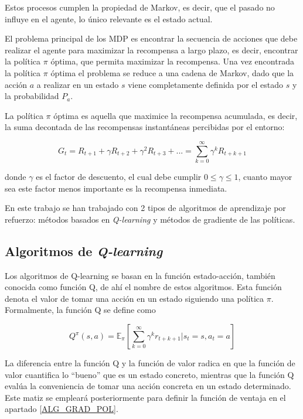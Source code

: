 Estos procesos cumplen la propiedad de Markov, es decir, que el pasado no influye en el agente, lo único relevante es el estado actual.

El problema principal de los MDP es encontrar la secuencia de acciones que debe realizar el agente para maximizar la recompensa a largo plazo, es decir, encontrar la política $\pi$ 
óptima, que permita maximizar la recompensa. Una vez encontrada la política $\pi$ óptima el problema se reduce a una cadena de Markov, dado que la acción $a$ a realizar en un estado $s$ viene completamente definida por el estado $s$ y la probabilidad $P_a$. 

La política $\pi$ óptima es aquella que maximice la recompensa acumulada, es decir, la suma decontada de las recompensas instantáneas percibidas por el entorno:

\begin{equation}
	G_t = R_{t+1} + \gamma R_{t+2} + \gamma^2 R_{t+3} + ... = \sum_{k=0}^{\infty}\gamma^k R_{
	t+k+1}
\end{equation}

donde $\gamma$ es el factor de descuento, el cual debe cumplir $0 \le \gamma \le 1$, cuanto mayor sea este factor menos importante es la recompensa inmediata. 

En este trabajo se han trabajado con 2 tipos de algoritmos de aprendizaje por refuerzo: métodos basados en \textit{Q-learning} y métodos de gradiente de las políticas.

\subsection{Algoritmos de \textit{Q-learning}}
Los algoritmos de Q-learning se basan en la función estado-acción, también conocida como función Q, de ahí el nombre de estos algoritmos. Esta función denota el valor de tomar una acción en un estado siguiendo una política $\pi$. Formalmente, la función Q se define como

\begin{equation}
	Q^\pi(s,a) =  \mathbb{E}_\pi\left[\sum_{k=0}^{\infty}{\gamma^k r_{t+k+1}}\Big|s_t=s,a_t = a\right]
\end{equation}

La diferencia entre la función Q y la función de valor radica en que la función de valor cuantifica lo ``bueno'' que es un estado concreto, mientras que la función Q evalúa la conveniencia de tomar una acción concreta en un estado determinado. Este matiz se empleará posteriormente para definir la función de ventaja en el apartado \ref{ALG_GRAD_POL}.

